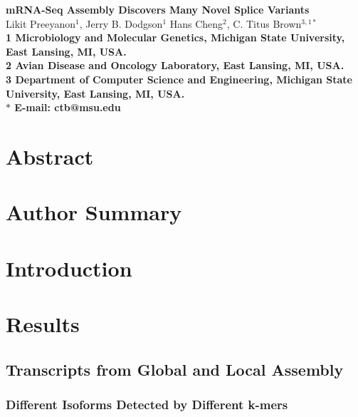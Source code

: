 \documentclass[10pt]{article}
\date{}
\begin{document}
\begin{flushleft}
{\Large
\textbf{mRNA-Seq Assembly Discovers Many Novel Splice Variants}
}
\\
Likit Preeyanon$^{1}$, 
Jerry B. Dodgson$^{1}$
Hans Cheng$^{2}$, 
C. Titus Brown$^{3,1 \ast}$
\\
\bf{1} Microbiology and Molecular Genetics, Michigan State University, East Lansing, MI, USA.
\\
\bf{2} Avian Disease and Oncology Laboratory, East Lansing, MI, USA.
\\
\bf{3} Department of Computer Science and Engineering, Michigan State University, East Lansing, MI, USA.
\\
$\ast$ E-mail: ctb@msu.edu
\end{flushleft}

\section*{Abstract}

\section*{Author Summary}

\section*{Introduction}

\section*{Results}

\subsection*{Transcripts from Global and Local Assembly}
\subsubsection*{Different Isoforms Detected by Different k-mers}
\end{document}
